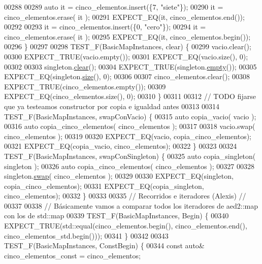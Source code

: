\begin{DoxyCode}
00288 
00289     \textcolor{keyword}{auto} it = cinco\_elementos.insert(\{7, \textcolor{stringliteral}{"siete"}\});
00290     it = cinco\_elementos.erase( it );
00291     EXPECT\_EQ(it, cinco\_elementos.end());
00292 
00293     it = cinco\_elementos.insert(\{0, \textcolor{stringliteral}{"cero"}\});
00294     it = cinco\_elementos.erase( it );
00295     EXPECT\_EQ(it, cinco\_elementos.begin());
00296 \}
00297 
00298 TEST\_F(BasicMapInstances, clear) \{
00299     vacio.clear();
00300     EXPECT\_TRUE(vacio.empty());
00301     EXPECT\_EQ(vacio.size(), 0);
00302 
00303     singleton.\hyperlink{classaed2_1_1map_a2bfa5165825979bf2431db55bc6bc9ca_a2bfa5165825979bf2431db55bc6bc9ca}{clear}();
00304     EXPECT\_TRUE(singleton.\hyperlink{classaed2_1_1map_af5320ca0a7df4d16015441d5d055a7ee_af5320ca0a7df4d16015441d5d055a7ee}{empty}());
00305     EXPECT\_EQ(singleton.\hyperlink{classaed2_1_1map_a89f2613f926ac13293eafe65889d6021_a89f2613f926ac13293eafe65889d6021}{size}(), 0);
00306 
00307     cinco\_elementos.clear();
00308     EXPECT\_TRUE(cinco\_elementos.empty());
00309     EXPECT\_EQ(cinco\_elementos.size(), 0);
00310 \}
00311 
00312 \textcolor{comment}{// TODO fijarse que ya testeamos constructor por copia e igualdad antes}
00313 
00314 TEST\_F(BasicMapInstances, swapConVacio) \{
00315     \textcolor{keyword}{auto} copia\_vacio( vacio );
00316     \textcolor{keyword}{auto} copia\_cinco\_elementos( cinco\_elementos );
00317 
00318     vacio.swap( cinco\_elementos );
00319 
00320     EXPECT\_EQ(vacio, copia\_cinco\_elementos);
00321     EXPECT\_EQ(copia\_vacio, cinco\_elementos);
00322 \}
00323 
00324 TEST\_F(BasicMapInstances, swapConSingleton) \{
00325     \textcolor{keyword}{auto} copia\_singleton( singleton );
00326     \textcolor{keyword}{auto} copia\_cinco\_elementos( cinco\_elementos );
00327 
00328     singleton.\hyperlink{classaed2_1_1map_a43ddb71cc91e5c6021a7a1f243d6cc4a_a43ddb71cc91e5c6021a7a1f243d6cc4a}{swap}( cinco\_elementos );
00329 
00330     EXPECT\_EQ(singleton, copia\_cinco\_elementos);
00331     EXPECT\_EQ(copia\_singleton, cinco\_elementos);
00332 \}
00333 
00335 \textcolor{comment}{// Recorridos e iteradores (Alexis) //}
00337 \textcolor{comment}{}
00338 \textcolor{comment}{// Básicamente vamos a comparar todos los iteradores de aed2::map con los de
       std::map}
00339 TEST\_F(BasicMapInstances, Begin) \{
00340     EXPECT\_TRUE(std::equal(cinco\_elementos.begin(), cinco\_elementos.end(), 
      cinco\_elementos\_std.begin()));
00341 \}
00342 
00343 TEST\_F(BasicMapInstances, ConstBegin) \{
00344     \textcolor{keyword}{const} \textcolor{keyword}{auto}& cinco\_elementos\_const = cinco\_elementos;

\end{DoxyCode}
